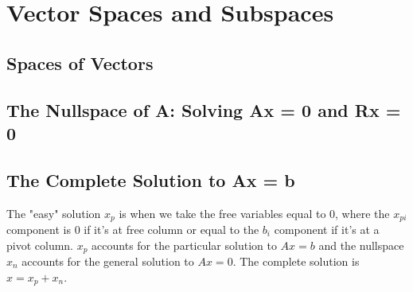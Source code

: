 \chapter{Vector Spaces and Subspaces}

\section{Spaces of Vectors}
\section{The Nullspace of A: Solving Ax = 0 and Rx = 0}

\section{The Complete Solution to Ax = b}
The "easy" solution $x_p$ is when we take the free variables equal to $0$, where the $x_{pi}$ component is $0$ if it's at free column or equal to the $b_i$ component if it's at a pivot column. $x_p$ accounts for the particular solution to $Ax = b$ and the nullspace $x_n$ accounts for the general solution to $Ax = 0$. The complete solution is $x = x_p + x_n$.  
